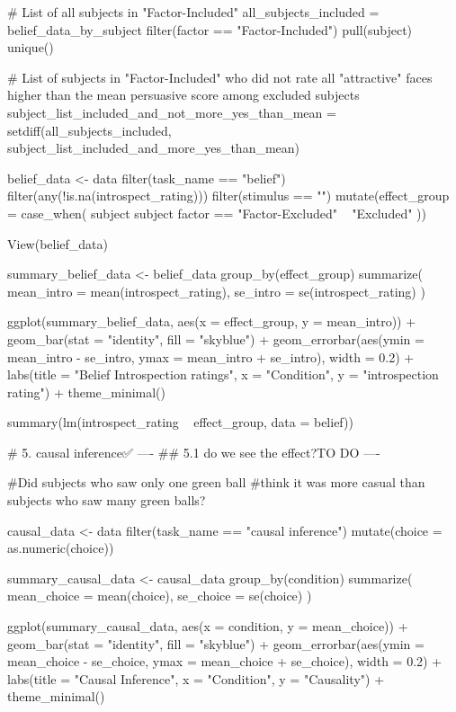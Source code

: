 \documentclass{article}
\begin{document}
# List of all subjects in "Factor-Included"
all_subjects_included = belief_data_by_subject %
  filter(factor == "Factor-Included") %
  pull(subject) %
  unique()

# List of subjects in "Factor-Included" who did not rate all "attractive" faces higher than the mean persuasive score among excluded subjects
subject_list_included_and_not_more_yes_than_mean = setdiff(all_subjects_included, subject_list_included_and_more_yes_than_mean)


belief_data <- data %
  filter(task_name == "belief") %
  filter(any(!is.na(introspect_rating))) %
  filter(stimulus == "") %
  mutate(effect_group = case_when(
    subject %
    subject %
    factor == "Factor-Excluded" ~ "Excluded"
  )) 

View(belief_data)

summary_belief_data <- belief_data %
  group_by(effect_group) %
  summarize(
    mean_intro = mean(introspect_rating),
    se_intro = se(introspect_rating)
  )

ggplot(summary_belief_data, aes(x = effect_group, y = mean_intro)) +
  geom_bar(stat = "identity", fill = "skyblue") +
  geom_errorbar(aes(ymin = mean_intro - se_intro, ymax = mean_intro + se_intro), width = 0.2) +
  labs(title = "Belief Introspection ratings", x = "Condition", y = "introspection rating") +
  theme_minimal()


summary(lm(introspect_rating ~ effect_group, data = belief))

# 5. causal inference✅  ----
    ## 5.1 do we see the effect?TO DO ----

#Did subjects who saw only one green ball 
#think it was more casual than subjects who saw many green balls?

causal_data <- data %
  filter(task_name == "causal inference") %
  mutate(choice = as.numeric(choice))

summary_causal_data <- causal_data %
  group_by(condition) %
  summarize(
    mean_choice = mean(choice),
    se_choice = se(choice)
  )

ggplot(summary_causal_data, aes(x = condition, y = mean_choice)) +
  geom_bar(stat = "identity", fill = "skyblue") +
  geom_errorbar(aes(ymin = mean_choice - se_choice, ymax = mean_choice + se_choice), width = 0.2) +
  labs(title = "Causal Inference", x = "Condition", y = "Causality") +
  theme_minimal()
\end{document}
